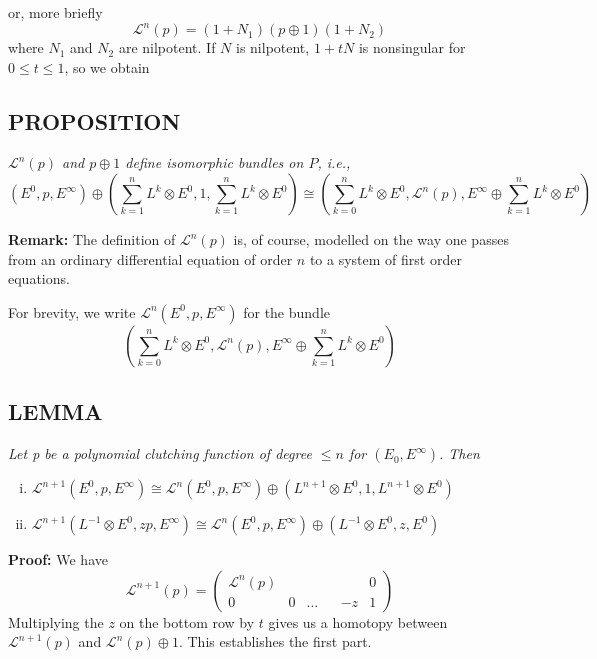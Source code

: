 or, more briefly
\begin{equation*}
    \mathcal{L}^n(p) = (1 + N_1)(p \oplus 1)(1 + N_2)
\end{equation*}
where $N_1$ and $N_2$ are nilpotent. If $N$ is nilpotent, $1 + tN$ is nonsingular for $0 \leq t \leq 1$, so we obtain

\subsection{PROPOSITION}\label{pro:2.2.5} \textit{$\mathcal{L}^n(p)$ and $p \oplus 1$ define isomorphic bundles on $P$, i.e.,}
\begin{equation*}
    (E^0, p, E^\infty) \oplus \left( \sum_{k = 1}^n L^k \otimes E^0, 1, \sum_{k = 1}^n L^k \otimes E^0 \right) \cong \left( \sum_{k = 0}^n L^k \otimes E^0, \mathcal{L}^n(p), E^\infty \oplus \sum_{k = 1}^n L^k \otimes E^0 \right)
\end{equation*} \par

\textbf{Remark:} The definition of $\mathcal{L}^n(p)$ is, of course, modelled on the way one passes from an ordinary differential equation of order $n$ to a system of first order equations. \par 

For brevity, we write $\mathcal{L}^n(E^0, p, E^\infty)$ for the bundle
\begin{equation*}
    \left( \sum_{k = 0}^n L^k \otimes E^0, \mathcal{L}^n(p), E^\infty \oplus \sum_{k = 1}^n L^k \otimes E^0 \right)
\end{equation*}

\subsection{LEMMA}\label{lem:2.2.6} \textit{Let p be a polynomial clutching function of degree $\leq n$  for $(E_0, E^\infty)$. Then}
\begin{enumerate}[(i)]
    \item $\mathcal{L}^{n+1}(E^0, p, E^\infty) \cong \mathcal{L}^n(E^0, p, E^\infty) \oplus (L^{n+1} \otimes E^0, 1, L^{n+1} \otimes E^0)$
    \item $\mathcal{L}^{n+1}(L^{-1} \otimes E^0, zp, E^\infty) \cong \mathcal{L}^n(E^0, p, E^\infty) \oplus (L^{-1} \otimes E^0, z, E^0)$
\end{enumerate}

\textbf{Proof:} We have
\begin{equation*}
    \mathcal{L}^{n+1}(p) =
    \begin{pmatrix}
        \mathcal{L}^n(p) &&&&& 0 \\
        0 & 0 & \ldots & & -z & 1
    \end{pmatrix}
\end{equation*}
Multiplying the $z$ on the bottom row by $t$ gives us a homotopy between $\mathcal{L}^{n+1}(p)$ and $\mathcal{L}^n(p) \oplus 1$. This establishes the first part. \par 

